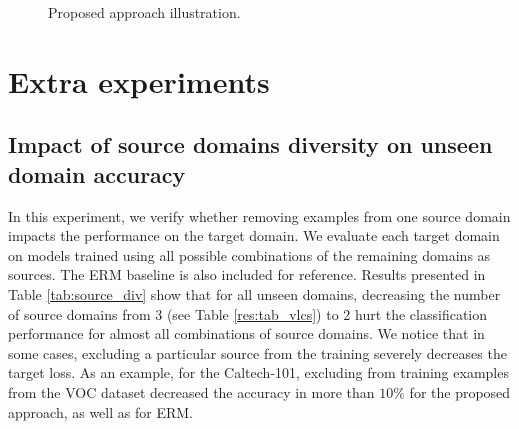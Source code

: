 \documentclass{article}
\begin{document}
\begin{figure}[h]
{
}
\caption{Proposed approach illustration.}
\label{fig:method}
\end{figure}

\section{Extra experiments}
\subsection{Impact of source domains diversity on unseen domain accuracy}
In this experiment, we verify whether removing examples from one source domain impacts the performance on the target domain. We evaluate each target domain on models trained using all possible combinations of the remaining domains as sources. The ERM baseline is also included for reference. Results presented in Table \ref{tab:source_div} show that for all unseen domains, decreasing the number of source domains from 3 (see Table \ref{res:tab_vlcs}) to 2 hurt the classification performance for almost all combinations of source domains. We notice that in some cases, excluding a particular source from the training severely decreases the target loss. As an example, for the Caltech-101, excluding from training examples from the VOC dataset decreased the accuracy in more than $10\%$ for the proposed approach, as well as for ERM.    
\end{document}
